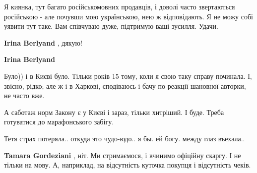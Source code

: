 \begin{itemize}
\begin{itemize}
Я киянка, тут багато російськомовних продавців, і доволі часто звертаються
російською - але почувши мою українською, нею ж відповідають. Я не можу собі
уявити тут таке. Вам співчуваю дуже, підтримую ваші зусилля. Удачи.


 
\textbf{Irina Berlyand} , дякую!

 
\textbf{Irina Berlyand}

Було)) і в Києві було. Тільки років 15 тому, коли я свою таку справу починала.
І, звісно, рідко; але ж і в Харкові, сподіваюсь і бачу по реакції шановної
авторки, не часто вже.

А саботаж норм Закону є у Києві і зараз, тільки хитріший. І буде. Треба
готуватися до марафонського забігу.

\end{itemize}

 
Тетя страх потеряла.. откуда это чудо-юдо.. я бы. ей богу. между глаз въехала..

\begin{itemize}
 
\textbf{Tamara Gordeziani} , ніт. Ми стримаємося, і вчинимо офіційну скаргу. І не тільки на мову. А, наприклад, на відсутність куточка покупця і відсутність чеків.

 

\end{itemize}
\end{itemize}
